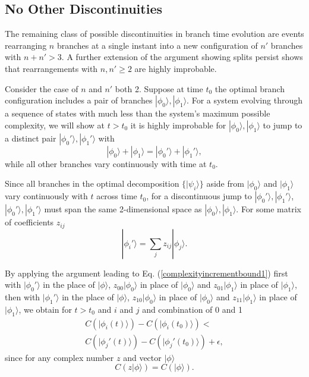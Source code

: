 \documentclass[12pt,amsmath,amssymb,onecolumn]{revtex4-2}
\begin{document}
\subsection{\label{subsec:norearrangments} No Other Discontinuities}

The remaining class of possible discontinuities
in branch time evolution 
are events
rearranging $n$ branches
at a single instant into a new configuration of $n'$ branches with $n + n' > 3$.
A further extension
of the argument showing splits persist
shows that rearrangements with $n, n' \ge 2$
are highly improbable.


Consider the case of $n$ and $n'$ both 2.
Suppose at time $t_0$ the optimal branch configuration includes
a pair of branches $|\phi_0 \rangle , |\phi_1 \rangle $.
For a system evolving through a sequence
of states with much less than the system's
maximum possible complexity,
we will show at $t > t_0$ it is highly improbable for
$|\phi_0 \rangle , |\phi_1 \rangle $
to jump to
a distinct pair $|\phi_0' \rangle , |\phi_1' \rangle $ with
\begin{equation}
  \label{merger2}
  |\phi_0 \rangle  + |\phi_1 \rangle  = |\phi_0' \rangle  + |\phi_1' \rangle ,
\end{equation}
while all other branches
vary continuously with time at $t_0$.

Since all branches in the optimal decomposition $\{ |\psi_i \rangle \}$
aside from $|\phi_0 \rangle $ and $|\phi_1 \rangle $
vary continuously with $t$ across time $t_0$,
for a discontinuous jump to $|\phi_0' \rangle , |\phi_1' \rangle $, 
$|\phi_0' \rangle , |\phi_1' \rangle $ must span the same
2-dimensional space as $|\phi_0 \rangle , |\phi_1 \rangle $.
For some matrix of coefficients $z_{ij}$
\begin{equation}
  \label{phirotation}
  |\phi_i' \rangle  = \sum_j z_{ij} |\phi_j \rangle .
\end{equation}

By applying the argument leading to Eq. (\ref{complexityincrementbound1})
first with $|\phi_0' \rangle $ in the place of $|\phi \rangle $,
$z_{00} |\phi_0 \rangle $ in place of $|\phi_0 \rangle $ and 
$z_{01} |\phi_1 \rangle $ in place of $|\phi_1 \rangle $,
then with $|\phi_1' \rangle $ in the place of $|\phi \rangle $,
$z_{10} |\phi_0 \rangle $ in place of $|\phi_0 \rangle $ and 
$z_{11} |\phi_1 \rangle $ in place of $|\phi_1 \rangle $,
we obtain for $t > t_0$ and $i$ and $j$
and combination of 0 and 1
\begin{multline}
  \label{complexityincrementbound2}
  C( |\phi_i(t) \rangle ) - C(|\phi_i(t_0) \rangle ) < \\
  C( |\phi_j'(t) \rangle ) - C(|\phi_j'(t_0) \rangle ) + \epsilon,
\end{multline}
since for any complex number $z$ and vector $|\phi \rangle $
\begin{equation}
  \label{scaleinv}
  C( z|\phi \rangle ) = C( |\phi \rangle ).
\end{equation}
\end{document}
